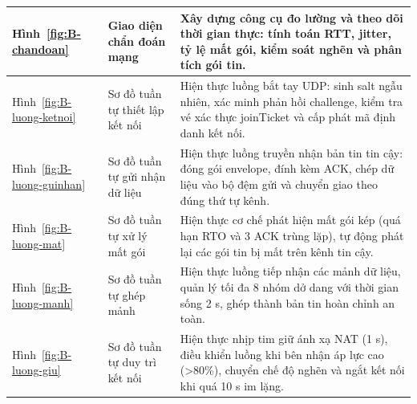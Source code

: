 \begin{center}
\begin{tabularx}{\linewidth}{|L{2.2cm}|L{4.2cm}|Y|}
Hình~\ref{fig:B-chandoan} & Giao diện chẩn đoán mạng & Xây dựng công cụ đo lường và theo dõi thời gian thực: tính toán RTT, jitter, tỷ lệ mất gói, kiểm soát nghẽn và phân tích gói tin. \\ \hline
Hình~\ref{fig:B-luong-ketnoi} & Sơ đồ tuần tự thiết lập kết nối & Hiện thực luồng bắt tay UDP: sinh salt ngẫu nhiên, xác minh phản hồi challenge, kiểm tra vé xác thực joinTicket và cấp phát mã định danh kết nối. \\ \hline
Hình~\ref{fig:B-luong-guinhan} & Sơ đồ tuần tự gửi nhận dữ liệu & Hiện thực luồng truyền nhận bản tin tin cậy: đóng gói envelope, đính kèm ACK, chép dữ liệu vào bộ đệm gửi và chuyển giao theo đúng thứ tự kênh. \\ \hline
Hình~\ref{fig:B-luong-mat} & Sơ đồ tuần tự xử lý mất gói & Hiện thực cơ chế phát hiện mất gói kép (quá hạn RTO và 3 ACK trùng lặp), tự động phát lại các gói tin bị mất trên kênh tin cậy. \\ \hline
Hình~\ref{fig:B-luong-manh} & Sơ đồ tuần tự ghép mảnh & Hiện thực luồng tiếp nhận các mảnh dữ liệu, quản lý tối đa 8 nhóm dở dang với thời gian sống 2 s, ghép thành bản tin hoàn chỉnh an toàn. \\ \hline
Hình~\ref{fig:B-luong-giu} & Sơ đồ tuần tự duy trì kết nối & Hiện thực nhịp tim giữ ánh xạ NAT (1 s), điều khiển luồng khi bên nhận áp lực cao (>80\%), chuyển chế độ nghẽn và ngắt kết nối khi quá 10 s im lặng. \\ \hline
\end{tabularx}
\end{center}
